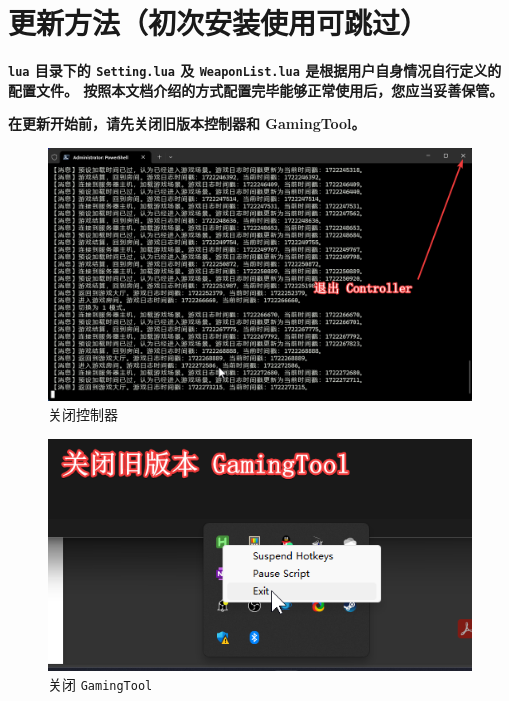 \section{更新方法（初次安装使用可跳过）}

\textbf{\color{red}\lstinline{lua} 目录下的 \lstinline{Setting.lua} 及 \lstinline{WeaponList.lua} 是根据用户自身情况自行定义的配置文件。
按照本文档介绍的方式配置完毕能够正常使用后，您应当妥善保管。}

\textbf{\color{red}在更新开始前，请先关闭旧版本控制器和 GamingTool。}

\begin{figure}[H]
    \Centering
    \includegraphics[width=\textwidth]{docs/assets/update/close_controller.png}
    \caption{关闭控制器}
\end{figure}


\begin{figure}[H]
    \Centering
    \includegraphics[width=\textwidth]{docs/assets/update/close_gamingtool.png}
    \caption{关闭 \lstinline{GamingTool}}
\end{figure}

